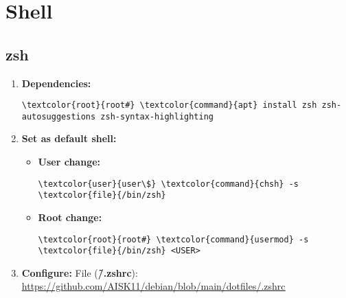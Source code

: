 \documentclass[10pt, a4paper, onecolumn, openany]{book} %
\begin{document}
\section{Shell}
\subsection{zsh}
\begin{enumerate}
    \item \textbf{Dependencies:}
\begin{Verbatim}[commandchars=\\\{\}]
\textcolor{root}{root#} \textcolor{command}{apt} install zsh zsh-autosuggestions zsh-syntax-highlighting
\end{Verbatim}
    \item \textbf{Set as default shell:}
    \begin{itemize}
        \item \textbf{User change:}
\begin{Verbatim}[commandchars=\\\{\}]
\textcolor{user}{user\$} \textcolor{command}{chsh} -s \textcolor{file}{/bin/zsh}
\end{Verbatim}
        \item \textbf{Root change:}
\begin{Verbatim}[commandchars=\\\{\}]
\textcolor{root}{root#} \textcolor{command}{usermod} -s \textcolor{file}{/bin/zsh} <USER>
\end{Verbatim}
    \end{itemize}
    \item \textbf{Configure:}
\newline File (\textbf{\textcolor{file}{\~/.zshrc}}):
\newline \underline{\url{https://github.com/AISK11/debian/blob/main/dotfiles/.zshrc}}
\end{enumerate}
\end{document}

